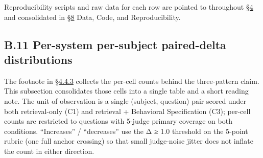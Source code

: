 Reproducibility scripts and raw data for each row are pointed to
throughout \hyperref[results]{§4} and consolidated in \hyperref[data-code-and-reproducibility]{§8} Data, Code, and Reproducibility.

\hypertarget{b.11-per-system-per-subject-paired-delta-distributions}{%
\subsection{B.11 Per-system per-subject paired-delta
distributions}\label{b.11-per-system-per-subject-paired-delta-distributions}}

The footnote in \hyperref[where-the-spec-helps-where-it-hurts-and-which-question-types-route-to-each]{§4.4.3} collects
the per-cell counts behind the three-pattern claim. This subsection
consolidates those cells into a single table and a short reading note.
The unit of observation is a single (subject, question) pair scored
under both retrieval-only (C1) and retrieval + Behavioral Specification
(C3); per-cell counts are restricted to questions with 5-judge primary
coverage on both conditions. ``Increases'' / ``decreases'' use the
\textbar Δ\textbar{} ≥ 1.0 threshold on the 5-point rubric (one full
anchor crossing) so that small judge-noise jitter does not inflate the
count in either direction.

